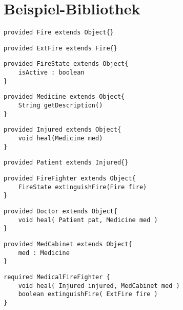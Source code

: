 \documentclass[a4paper,12pt]{article}
\begin{document}
\newpage
\section{Beispiel-Bibliothek}



\begin{lstlisting}[style = dsl]
provided Fire extends Object{}
\end{lstlisting}

\begin{lstlisting}[style = dsl]
provided ExtFire extends Fire{}
\end{lstlisting}


\begin{lstlisting}[style = dsl]
provided FireState extends Object{
	isActive : boolean
}
\end{lstlisting}

\begin{lstlisting}[style = dsl]
provided Medicine extends Object{
	String getDescription()
}
\end{lstlisting}

\begin{lstlisting}[style = dsl]
provided Injured extends Object{
	void heal(Medicine med)	
}
\end{lstlisting}


\begin{lstlisting}[style = dsl]
provided Patient extends Injured{}
\end{lstlisting}
\begin{lstlisting}[style = dsl]
provided FireFighter extends Object{
	FireState extinguishFire(Fire fire)
}
\end{lstlisting}

\begin{lstlisting}[style = dsl]
provided Doctor extends Object{	
	void heal( Patient pat, Medicine med )
}
\end{lstlisting}



\begin{lstlisting}[style = dsl]
provided MedCabinet extends Object{
	med : Medicine
}
\end{lstlisting}

\begin{lstlisting}[caption={Bibliothek \emph{ExampLe} von Typen},captionpos=b, style = dsl]
required MedicalFireFighter {
	void heal( Injured injured, MedCabinet med )
	boolean extinguishFire( ExtFire fire )	
}
\end{lstlisting}\label{lst:libEx}
\end{document}
